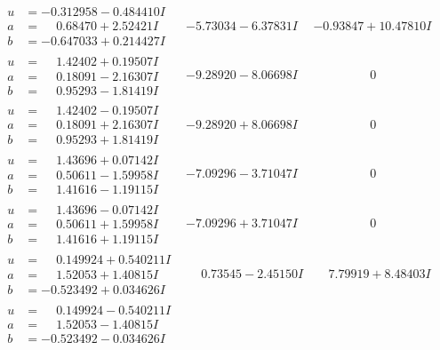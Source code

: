 \documentclass[1p]{elsarticle_modified}
\theoremstyle{definition}
\begin{document}
$$\begin{array}{c|c|c}
\begin{aligned}
u &= -0.312958 - 0.484410 I \\
a &= \phantom{-}0.68470 + 2.52421 I \\
b &= -0.647033 + 0.214427 I\end{aligned}
 & -5.73034 - 6.37831 I & -0.93847 + 10.47810 I \\ \hline\begin{aligned}
u &= \phantom{-}1.42402 + 0.19507 I \\
a &= \phantom{-}0.18091 - 2.16307 I \\
b &= \phantom{-}0.95293 - 1.81419 I\end{aligned}
 & -9.28920 - 8.06698 I & \phantom{-0.000000 } 0 \\ \hline\begin{aligned}
u &= \phantom{-}1.42402 - 0.19507 I \\
a &= \phantom{-}0.18091 + 2.16307 I \\
b &= \phantom{-}0.95293 + 1.81419 I\end{aligned}
 & -9.28920 + 8.06698 I & \phantom{-0.000000 } 0 \\ \hline\begin{aligned}
u &= \phantom{-}1.43696 + 0.07142 I \\
a &= \phantom{-}0.50611 - 1.59958 I \\
b &= \phantom{-}1.41616 - 1.19115 I\end{aligned}
 & -7.09296 - 3.71047 I & \phantom{-0.000000 } 0 \\ \hline\begin{aligned}
u &= \phantom{-}1.43696 - 0.07142 I \\
a &= \phantom{-}0.50611 + 1.59958 I \\
b &= \phantom{-}1.41616 + 1.19115 I\end{aligned}
 & -7.09296 + 3.71047 I & \phantom{-0.000000 } 0 \\ \hline\begin{aligned}
u &= \phantom{-}0.149924 + 0.540211 I \\
a &= \phantom{-}1.52053 + 1.40815 I \\
b &= -0.523492 + 0.034626 I\end{aligned}
 & \phantom{-}0.73545 - 2.45150 I & \phantom{-}7.79919 + 8.48403 I \\ \hline\begin{aligned}
u &= \phantom{-}0.149924 - 0.540211 I \\
a &= \phantom{-}1.52053 - 1.40815 I \\
b &= -0.523492 - 0.034626 I\end{aligned}

\end{array}$$
\end{document}
